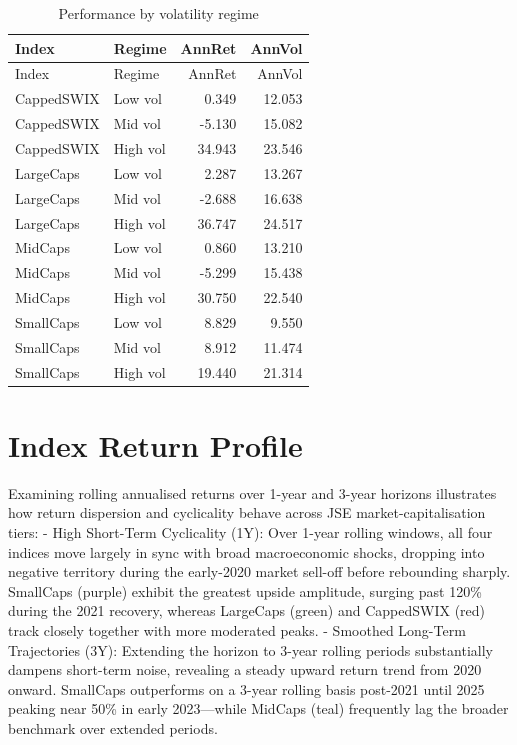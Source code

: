 \documentclass[11pt,preprint]{elsarticle}
\numberwithin{equation}{section}
\numberwithin{figure}{section}
\numberwithin{table}{section}
\begin{document}
\begin{longtable}[]{@{}llrr@{}}
\caption{Performance by volatility regime}\tabularnewline
\toprule\noalign{}
Index & Regime & AnnRet & AnnVol \\
\midrule\noalign{}
\endfirsthead
\toprule\noalign{}
Index & Regime & AnnRet & AnnVol \\
\midrule\noalign{}
\endhead
\bottomrule\noalign{}
\endlastfoot
CappedSWIX & Low vol & 0.349 & 12.053 \\
CappedSWIX & Mid vol & -5.130 & 15.082 \\
CappedSWIX & High vol & 34.943 & 23.546 \\
LargeCaps & Low vol & 2.287 & 13.267 \\
LargeCaps & Mid vol & -2.688 & 16.638 \\
LargeCaps & High vol & 36.747 & 24.517 \\
MidCaps & Low vol & 0.860 & 13.210 \\
MidCaps & Mid vol & -5.299 & 15.438 \\
MidCaps & High vol & 30.750 & 22.540 \\
SmallCaps & Low vol & 8.829 & 9.550 \\
SmallCaps & Mid vol & 8.912 & 11.474 \\
SmallCaps & High vol & 19.440 & 21.314 \\
\end{longtable}

\section{Index Return Profile}\label{index-return-profile}

Examining rolling annualised returns over 1-year and 3-year horizons
illustrates how return dispersion and cyclicality behave across JSE
market-capitalisation tiers: - High Short-Term Cyclicality (1Y): Over
1-year rolling windows, all four indices move largely in sync with broad
macroeconomic shocks, dropping into negative territory during the
early-2020 market sell-off before rebounding sharply. SmallCaps (purple)
exhibit the greatest upside amplitude, surging past 120\% during the
2021 recovery, whereas LargeCaps (green) and CappedSWIX (red) track
closely together with more moderated peaks. - Smoothed Long-Term
Trajectories (3Y): Extending the horizon to 3-year rolling periods
substantially dampens short-term noise, revealing a steady upward return
trend from 2020 onward. SmallCaps outperforms on a 3-year rolling basis
post-2021 until 2025 peaking near 50\% in early 2023---while MidCaps
(teal) frequently lag the broader benchmark over extended periods.
\end{document}
